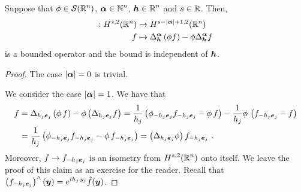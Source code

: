 \begin{prop} \label{ell_reg_prop1}
Suppose that $\displaystyle \phi \in \mathcal{S}(\mathbb{R}^n)$,
$\displaystyle {\bm{\alpha}} \in \mathbb{N}^n$, $\displaystyle {\bm{h}}\in \mathbb{R}^n$
and $s \in \mathbb{R}$.  Then,
\begin{align*}
[\Delta^{\VEC{\alpha}}_{\VEC{h}}, \phi]: H^{s,2}(\RR^n) &\rightarrow 
H^{s-|\VEC{\alpha}|+1,2}(\RR^n) \\
f &\mapsto \Delta^{\VEC{\alpha}}_{\VEC{h}} \left( \phi f \right) -
\phi \Delta^{\VEC{\alpha}}_\VEC{h} f
\end{align*}
is a bounded operator and the bound is independent of ${\bm{h}}$.
\end{prop}

\begin{proof}
The case $|{\bm{\alpha}}|=0$ is trivial.
  
 We consider the case $|{\bm{\alpha}}|=1$.  We have that
\begin{align*}
[\Delta_{h_j\VEC{e}_j},\phi] f
&= \Delta_{h_j\VEC{e}_j} \left( \phi\, f \right) -
\phi \left( \Delta_{h_j\VEC{e}_j} f \right)
= \frac{1}{h_j} \left( \phi_{-h_j\VEC{e}_j} f_{-h_j\VEC{e}_j}
- \phi\, f \right)
- \frac{1}{h_j} \phi \,\left( f_{-h_j\VEC{e}_j} - f \right) \\
&= \frac{1}{h_j} \left( \phi_{-h_j\VEC{e}_j} f_{-h_j\VEC{e}_j}
- \phi \, f_{-h_j\VEC{e}_j} \right)
= \left( \Delta_{h_j\VEC{e}_j} \phi \right) f_{-h_j\VEC{e}_j} \ .
\end{align*}
Moreover, $\displaystyle f \to f_{-h_j{\bm{e}}_j}$ is an isometry from
$\displaystyle H^{s,2}(\mathbb{R}^n)$ onto itself. We leave the proof of this
claim as an exercise for the reader.  Recall that
$\displaystyle \left(f_{-h_j{\bm{e}}_j}\right)^\wedge({\bm{y}}) = e^{i h_j\,y_j}
\hat{f}({\bm{y}})$.


\end{proof}

